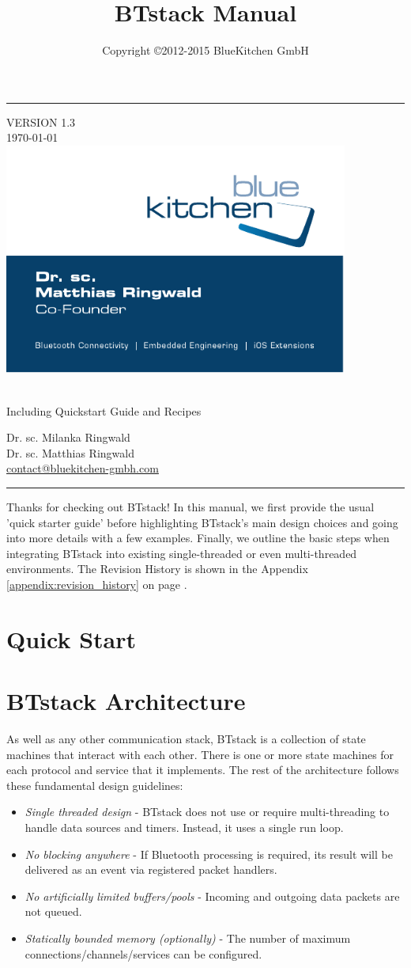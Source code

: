 \documentclass[a4paper,titlepage,oneside,12pt]{amsart} %
\title[BTstack Manual] {BTstack Manual}
\author{Copyright \copyright 2012-2015 BlueKitchen GmbH}
\makeatletter
\newcommand{\versionNr}{1.3}
\newcommand{\authorMila}{Dr. sc. Milanka Ringwald}
\newcommand{\authorMatthias}{Dr. sc. Matthias Ringwald}
\newcommand{\bkContact}{\href{contact@bluekitchen-gmbh.com}{contact@bluekitchen-gmbh.com}}
\newcommand{\barWidth}{0.3cm}
\renewcommand{\maketitle}{
  \begin{titlepage}
    \fosfamily
    \begin{center}
    \begin{minipage}[b]{\textwidth}
        \begin{minipage}[b]{.1\textwidth}
            \color{bkblue}\rule{\barWidth{}}{22cm}
        \end{minipage}
        \hfill\begin{minipage}[b]{.8\textwidth}\begin{flushright}
            {\color{bkblue}VERSION \versionNr{} \\
            \today \\}
            \vspace*{7.5cm}
            \hfill\includegraphics[width=0.85\textwidth]{picts/bklogo.pdf}
            \vspace*{1.5cm}
            \begin{spacing}{2} 
                {\huge \color{bkblue} \@title} \\ 
                {\Large \color{bklightblue} Including Quickstart Guide and Recipes}   
            \end{spacing} 
            \vspace*{1.5cm}
            {\color{bkblue}\large \authorMila \\
            \large \authorMatthias \\
            \large \bkContact\\ }
        \end{flushright}\end{minipage}
        \vfill
        \begin{minipage}[b]{\textwidth}
            \color{bklightblue}\rule{\barWidth{}}{\barWidth{}}
        \end{minipage}
    \end{minipage}

    
    \end{center}
  \end{titlepage}
}
\makeatother
\begin{document}
\maketitle

\tableofcontents
\pagebreak


Thanks for checking out BTstack! In this manual, we first provide the usual 'quick starter guide' before highlighting BTstack's main design choices and going into more details with a few examples. Finally, we outline the basic steps when integrating BTstack into existing single-threaded or even multi-threaded environments. The Revision History is shown in the Appendix \ref{appendix:revision_history} on page \pageref{appendix:revision_history}.

\section{Quick Start}


\section{BTstack Architecture}

As well as any other communication stack, BTstack is a collection of state machines that interact with each other. There is one or more state machines for each protocol and service that it implements. The rest of the architecture follows these fundamental design guidelines:

\begin{itemize}
\item \emph{Single threaded design} - BTstack does not use or require multi-threading to handle data sources and timers. Instead, it uses a single run loop.
\item \emph{No blocking anywhere} - If Bluetooth processing is required, its result will be delivered as an event via registered packet handlers.
\item \emph{No artificially limited buffers/pools} - Incoming and outgoing data packets are not queued.
\item \emph{Statically bounded memory (optionally)} - The number of maximum connections/channels/services can be configured.
\end{itemize}
\end{document}
